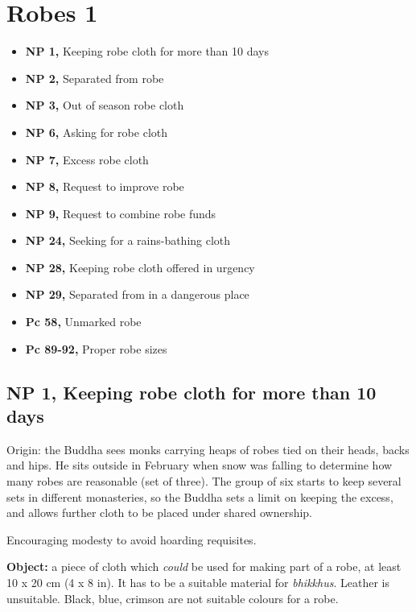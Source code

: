 \chapter{Robes 1}

\begin{itemize}
\tightlist
\item
  \textbf{NP 1,} Keeping robe cloth for more than 10 days
\item
  \textbf{NP 2,} Separated from robe
\item
  \textbf{NP 3,} Out of season robe cloth
\item
  \textbf{NP 6,} Asking for robe cloth
\item
  \textbf{NP 7,} Excess robe cloth
\item
  \textbf{NP 8,} Request to improve robe
\item
  \textbf{NP 9,} Request to combine robe funds
\item
  \textbf{NP 24,} Seeking for a rains-bathing cloth
\item
  \textbf{NP 28,} Keeping robe cloth offered in urgency
\item
  \textbf{NP 29,} Separated from in a dangerous place
\item
  \textbf{Pc 58,} Unmarked robe
\item
  \textbf{Pc 89-92,} Proper robe sizes
\end{itemize}


\vspace*{-2\baselineskip}

\section{NP 1, Keeping robe cloth for more than 10 days}

\enlargethispage{2\baselineskip}

Origin: the Buddha sees monks carrying heaps of robes tied on their
heads, backs and hips. He sits outside in February when snow was falling
to determine how many robes are reasonable (set of three). The group of
six starts to keep several sets in different monasteries, so the Buddha
sets a limit on keeping the excess, and allows further cloth to be
placed under shared ownership.

Encouraging modesty to avoid hoarding requisites.

\textbf{Object:} a piece of cloth which \emph{could} be used for making
part of a robe, at least 10 x 20 cm (4 x 8 in). It has to be a suitable
material for \emph{bhikkhus}. Leather is unsuitable. Black, blue,
crimson are not suitable colours for a robe.

